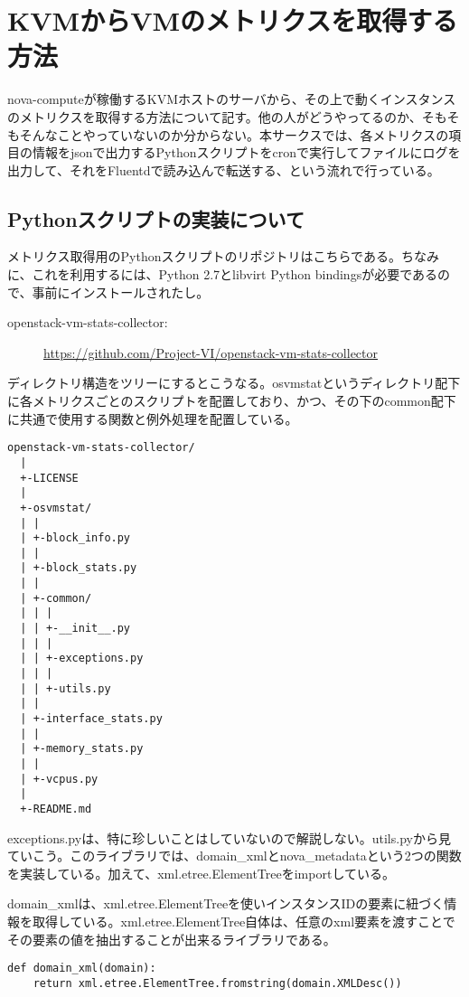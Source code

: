 \section{KVMからVMのメトリクスを取得する方法}
nova-computeが稼働するKVMホストのサーバから、その上で動くインスタンスのメトリクスを取得する方法について記す。他の人がどうやってるのか、そもそもそんなことやっていないのか分からない。本サークスでは、各メトリクスの項目の情報をjsonで出力するPythonスクリプトをcronで実行してファイルにログを出力して、それをFluentdで読み込んで転送する、という流れで行っている。

\subsection{Pythonスクリプトの実装について}
メトリクス取得用のPythonスクリプトのリポジトリはこちらである。ちなみに、これを利用するには、Python 2.7とlibvirt Python bindingsが必要であるので、事前にインストールされたし。

\begin{description}
  \item[openstack-vm-stats-collector:] \url{https://github.com/Project-VI/openstack-vm-stats-collector}
\end{description}

ディレクトリ構造をツリーにするとこうなる。osvmstatというディレクトリ配下に各メトリクスごとのスクリプトを配置しており、かつ、その下のcommon配下に共通で使用する関数と例外処理を配置している。

\begin{lstlisting}
openstack-vm-stats-collector/
  |
  +-LICENSE
  |
  +-osvmstat/
  | |
  | +-block_info.py
  | |
  | +-block_stats.py
  | |
  | +-common/
  | | |
  | | +-__init__.py
  | | |
  | | +-exceptions.py
  | | |
  | | +-utils.py
  | |
  | +-interface_stats.py
  | |
  | +-memory_stats.py
  | |
  | +-vcpus.py
  |
  +-README.md

\end{lstlisting}

exceptions.pyは、特に珍しいことはしていないので解説しない。utils.pyから見ていこう。このライブラリでは、domain_xmlとnova_metadataという2つの関数を実装している。加えて、xml.etree.ElementTreeをimportしている。

domain_xmlは、xml.etree.ElementTreeを使いインスタンスIDの要素に紐づく情報を取得している。xml.etree.ElementTree自体は、任意のxml要素を渡すことでその要素の値を抽出することが出来るライブラリである。

\begin{lstlisting}
def domain_xml(domain):
    return xml.etree.ElementTree.fromstring(domain.XMLDesc())
\end{lstlisting}

